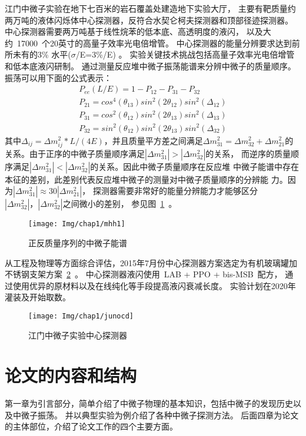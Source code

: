 江门中微子实验在地下七百米的岩石覆盖处建造地下实验大厅，
主要有靶质量约两万吨的液体闪烁体中心探测器，反符合水契仑柯夫探测器和顶部径迹探测器。
中心探测器需要两万吨基于线性烷苯的低本底、高透明度的液闪，
以及大约~17000~个20英寸的高量子效率光电倍增管。
中心探测器的能量分辨要求达到前所未有的3\% 水平($\sigma$/E=3\%/E)
\citep{zhan2008determination,zhan2009experimental,li2013unambiguous}。
实验关键技术挑战包括高量子效率光电倍增管和低本底液闪研制。
通过测量反应堆中微子振荡能谱来分辨中微子的质量顺序。振荡可以用下面的公式表示：
\begin{eqnarray}\label{eq:eesur}
P_{ee}(L/E)=1-P_{12}-P_{31}-P_{32}\\
P_{21} = cos^4(\theta_{13})sin^2(2\theta_{12})sin^2(\Delta_{12}) \nonumber \\
P_{31} = cos^2(\theta_{12})sin^2(2\theta_{13})sin^2(\Delta_{13}) \nonumber \\
P_{32} = sin^2(\theta_{12})sin^2(2\theta_{13})sin^2(\Delta_{32}) \nonumber
\end{eqnarray}
其中$\Delta_{ij}=\Delta m^2_{ij}*L/(4E)$，并且质量平方差之间满足$\Delta m^2_{31}=\Delta m^2_{32}
+ \Delta m^2_{21}$的关系。由于正序的中微子质量顺序满足$|\Delta m^2_{31}| > |\Delta m^2_{32}|$的关系，
而逆序的质量顺序满足$|\Delta m^2_{31}| < |\Delta m^2_{32}|$的关系。因此中微子质量顺序在反应堆
中微子能谱中存在本征的差别，此差别代表反应堆中微子的测量对中微子质量顺序的分辨能
力。因为$|\Delta m^2_{31}|\approx 30|\Delta m^2_{21}|$，
探测器需要非常好的能量分辨能力才能够区分$|\Delta m^2_{32}|，|\Delta m^2_{32}|$之间微小的差别，
参见图~\ref{fig:mhh1}~。
\begin{figure}[!htb]
  \centering
   \texttt{[image: Img/chap1/mhh1]}
    \caption{ 正反质量序列的中微子能谱 }
  \label{fig:mhh1}
\end{figure}
从工程及物理等方面综合评估，2015年7月份中心探测器方案选定为有机玻璃罐加不锈钢支架方案~\ref{fig:junocd}~。
中心探测器液闪使用~LAB + PPO + bis-MSB~配方，
通过使用优异的原材料以及在线纯化等手段提高液闪衰减长度。
实验计划在2020年灌装及开始取数。
\begin{figure}[!htbp]
  \centering
   \texttt{[image: Img/chap1/junocd]}
    \caption{ 江门中微子实验中心探测器 }
  \label{fig:junocd}
\end{figure}
\section{论文的内容和结构}
第一章为引言部分，简单介绍了中微子物理的基本知识，包括中微子的发现历史以及中微子振荡。
并以典型实验为例介绍了各种中微子探测方法。
后面四章为论文的主体部位，介绍了论文工作的四个主要方面。

